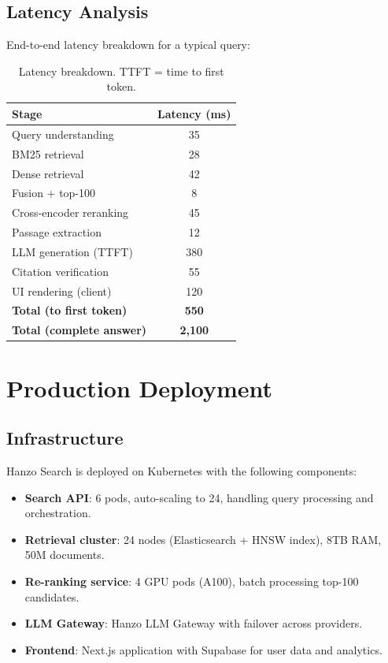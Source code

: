 \documentclass[11pt,twocolumn]{article}
\begin{document}
\subsection{Latency Analysis}

End-to-end latency breakdown for a typical query:

\begin{table}[H]
\centering
\begin{tabular}{lc}
\toprule
\textbf{Stage} & \textbf{Latency (ms)} \\
\midrule
Query understanding & 35 \\
BM25 retrieval & 28 \\
Dense retrieval & 42 \\
Fusion + top-100 & 8 \\
Cross-encoder reranking & 45 \\
Passage extraction & 12 \\
LLM generation (TTFT) & 380 \\
Citation verification & 55 \\
UI rendering (client) & 120 \\
\midrule
\textbf{Total (to first token)} & \textbf{550} \\
\textbf{Total (complete answer)} & \textbf{2,100} \\
\bottomrule
\end{tabular}
\caption{Latency breakdown. TTFT = time to first token.}
\label{tab:latency}
\end{table}

\section{Production Deployment}
\label{sec:production}

\subsection{Infrastructure}

Hanzo Search is deployed on Kubernetes with the following components:

\begin{itemize}[leftmargin=1.1em]
    \item \textbf{Search API}: 6 pods, auto-scaling to 24, handling query processing and orchestration.
    \item \textbf{Retrieval cluster}: 24 nodes (Elasticsearch + HNSW index), 8TB RAM, 50M documents.
    \item \textbf{Re-ranking service}: 4 GPU pods (A100), batch processing top-100 candidates.
    \item \textbf{LLM Gateway}: Hanzo LLM Gateway with failover across providers.
    \item \textbf{Frontend}: Next.js application with Supabase for user data and analytics.
\end{itemize}
\end{document}
